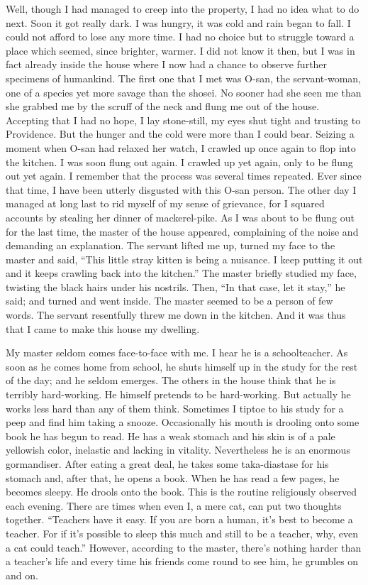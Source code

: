 \documentclass[12pt, openright]{book}
\begin{document}
Well, though I had managed to creep into the property, I had no idea
what to do next. Soon it got really dark. I was hungry, it was cold and
rain began to fall. I could not afford to lose any more time. I had no
choice but to struggle toward a place which seemed, since brighter,
warmer. I did not know it then, but I was in fact already inside the
house where I now had a chance to observe further specimens of
humankind. The first one that I met was O-san, the servant-woman, one of
a species yet more savage than the shosei. No sooner had she seen me
than she grabbed me by the scruff of the neck and flung me out of the
house. Accepting that I had no hope, I lay stone-still, my eyes shut
tight and trusting to Providence. But the hunger and the cold were more
than I could bear. Seizing a moment when O-san had relaxed her watch, I
crawled up once again to flop into the kitchen. I was soon flung out
again. I crawled up yet again, only to be flung out yet again. I
remember that the process was several times repeated. Ever since that
time, I have been utterly disgusted with this O-san person. The other
day I managed at long last to rid myself of my sense of grievance, for I
squared accounts by stealing her dinner of mackerel-pike. As I was about
to be flung out for the last time, the master of the house appeared,
complaining of the noise and demanding an explanation. The servant
lifted me up, turned my face to the master and said, ``This little stray
kitten is being a nuisance. I keep putting it out and it keeps crawling
back into the kitchen.'' The master briefly studied my face, twisting
the black hairs under his nostrils. Then, ``In that case, let it stay,''
he said; and turned and went inside. The master seemed to be a person of
few words. The servant resentfully threw me down in the kitchen. And it
was thus that I came to make this house my dwelling.

My master seldom comes face-to-face with me. I hear he is a
schoolteacher. As soon as he comes home from school, he shuts himself up
in the study for the rest of the day; and he seldom emerges. The others
in the house think that he is terribly hard-working. He himself pretends
to be hard-working. But actually he works less hard than any of them
think. Sometimes I tiptoe to his study for a peep and find him taking a
snooze. Occasionally his mouth is drooling onto some book he has begun
to read. He has a weak stomach and his skin is of a pale yellowish
color, inelastic and lacking in vitality. Nevertheless he is an enormous
gormandiser. After eating a great deal, he takes some taka-diastase for
his stomach and, after that, he opens a book. When he has read a few
pages, he becomes sleepy. He drools onto the book. This is the routine
religiously observed each evening. There are times when even I, a mere
cat, can put two thoughts together. ``Teachers have it easy. If you are
born a human, it's best to become a teacher. For if it's possible to
sleep this much and still to be a teacher, why, even a cat could
teach.'' However, according to the master, there's nothing harder than a
teacher's life and every time his friends come round to see him, he
grumbles on and on.
\end{document}
